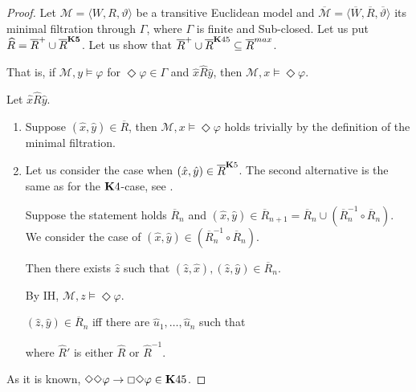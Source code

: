 \documentclass[a4paper]{article}
\theoremstyle{defin}
\theoremstyle{theorem}
\theoremstyle{prop}
\theoremstyle{lemma}
\theoremstyle{fact}
\theoremstyle{exercise}
\theoremstyle{ex}
\theoremstyle{col}
\theoremstyle{claim}
\begin{document}
\begin{proof}
  Let $\mathcal{M} = \langle W, R, \vartheta \rangle$ be a transitive Euclidean model and $\overline{\mathcal{M}} = \langle \overline{W}, \overline{R}, \overline{\vartheta} \rangle$ its minimal filtration through $\Gamma$, where $\Gamma$ is finite and Sub-closed. Let us put $\widehat{R} = \overline{R}^{+} \cup \overline{R}^{\bf K5}$. Let us show that $\overline{R}^{+} \cup \overline{R}^{{\bf K}45} \subseteq \overline{R}^{max}$.

  That is, if $\mathcal{M}, y \models \varphi$ for $\Diamond \varphi \in \Gamma$ and $\hat{x} \widehat{R} \hat{y}$, then $\mathcal{M}, x \models \Diamond \varphi$.

  Let $\hat{x} \widehat{R} \hat{y}$.

  \begin{enumerate}
    \item Suppose $(\hat{x}, \hat{y}) \in \overline{R}$, then $\mathcal{M}, x \models \Diamond \varphi$ holds trivially by the definition of the minimal filtration.
    \item Let us consider the case when $(\hat{x}, \hat{y}) \in \overline{R}^{{\bf K}5}$. The second alternative is the same as for the ${\bf K}4$-case, see \cite[p. 141]{chagrov}.

    Suppose the statement holds $\overline{R}_n$ and $(\hat{x}, \hat{y}) \in \overline{R}_{n + 1} = \overline{R}_n \cup (\overline{R}_n^{-1} \circ \overline{R}_n)$. We consider the case of $(\hat{x}, \hat{y}) \in (\overline{R}_n^{-1} \circ \overline{R}_n)$.

    Then there exists $\hat{z}$ such that $(\hat{z}, \hat{x}), (\hat{z}, \hat{y}) \in \overline{R}_n$.

    By IH, $\mathcal{M}, z \models \Diamond \varphi$.

    $(\hat{z}, \hat{y}) \in \overline{R}_n$ iff there are $\hat{u}_1, \dots, \hat{u}_n$ such that

    \vspace{\baselineskip}

    where $\widehat{R}'$ is either $\widehat{R}$ or $\widehat{R}^{-1}$.
  \end{enumerate}
  As it is known, $\Diamond \Diamond \varphi \to \Box \Diamond \varphi \in {\bf K}45$.


\end{proof}
\end{document}
